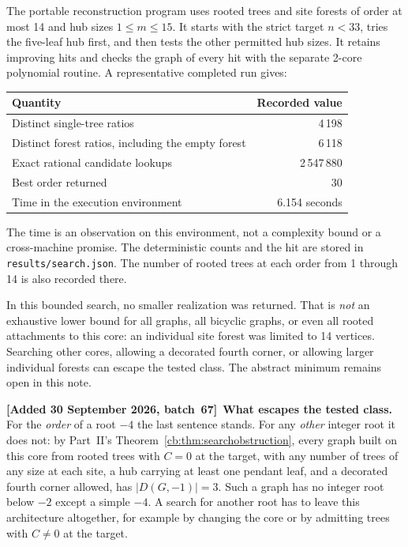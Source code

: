 \documentclass[11pt]{article}
\numberwithin{equation}{section}
\theoremstyle{definition}
\newenvironment{writenote}[1][]{\par\smallskip\begingroup\small\sloppy
 \noindent\textbf{[Added 30 September 2026, batch~67]}\if\relax\detokenize{#1}\relax\else~\textbf{#1.}\fi\ }%
 {\par\endgroup\smallskip}
\newcommand{\D}{D}
\begin{document}
The portable reconstruction program uses rooted trees and site forests
of order at most 14 and hub sizes \(1\le m\le15\). It starts with the
strict target \(n<33\), tries the five-leaf hub first, and then tests
the other permitted hub sizes. It retains improving hits and checks
the graph of every hit with the separate 2-core polynomial routine.
A representative completed run gives:
\begin{center}
\begin{tabular}{lr}
\toprule
Quantity & Recorded value\\
\midrule
Distinct single-tree ratios & 4\,198\\
Distinct forest ratios, including the empty forest & 6\,118\\
Exact rational candidate lookups & 2\,547\,880\\
Best order returned & 30\\
Time in the execution environment & 6.154 seconds\\
\bottomrule
\end{tabular}
\end{center}
The time is an observation on this environment, not a complexity bound
or a cross-machine promise. The deterministic counts and the hit are
stored in \texttt{results/search.json}. The number of rooted trees at
each order from 1 through 14 is also recorded there.

In this bounded search, no smaller realization was returned. That is
\emph{not} an exhaustive lower bound for all graphs, all bicyclic
graphs, or even all rooted attachments to this core: an individual
site forest was limited to 14 vertices. Searching other cores,
allowing a decorated fourth corner, or allowing larger individual
forests can escape the tested class. The abstract minimum remains open
in this note.

\begin{writenote}[What escapes the tested class]
For the \emph{order} of a root \(-4\) the last sentence stands. For any
\emph{other} integer root it does not: by Part~II's
Theorem~\ref{cb:thm:searchobstruction}, every graph built on this core
from rooted trees with \(C=0\) at the target, with any number of trees
of any size at each site, a hub carrying at least one pendant leaf, and
a decorated fourth corner allowed, has \(|\D(G,-1)|=3\). Such a graph has
no integer root below \(-2\) except a simple \(-4\). A search for another
root has to leave this architecture altogether, for example by changing
the core or by admitting trees with \(C\ne0\) at the target.
\end{writenote}
\end{document}

